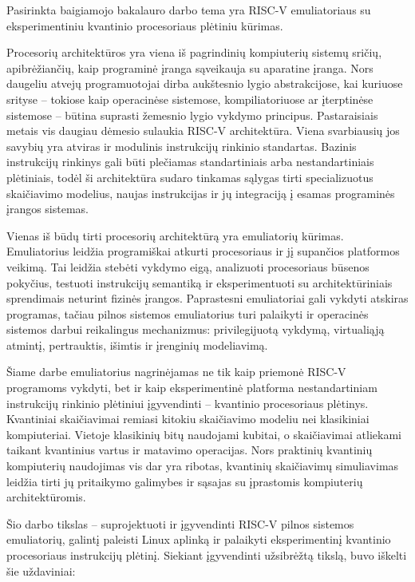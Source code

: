 
Pasirinkta baigiamojo bakalauro darbo tema yra RISC-V emuliatoriaus su eksperimentiniu kvantinio procesoriaus plėtiniu kūrimas.

Procesorių architektūros yra viena iš pagrindinių kompiuterių sistemų sričių, apibrėžiančių, kaip programinė įranga sąveikauja su aparatine įranga. Nors daugeliu atvejų programuotojai dirba aukštesnio lygio abstrakcijose, kai kuriuose srityse -- tokiose kaip operacinėse sistemose, kompiliatoriuose ar įterptinėse sistemose -- būtina suprasti žemesnio lygio vykdymo principus. Pastaraisiais metais vis daugiau dėmesio sulaukia RISC-V architektūra. Viena svarbiausių jos savybių yra atviras ir modulinis instrukcijų rinkinio standartas. Bazinis instrukcijų rinkinys gali būti plečiamas standartiniais arba nestandartiniais plėtiniais, todėl ši architektūra sudaro tinkamas sąlygas tirti specializuotus skaičiavimo modelius, naujas instrukcijas ir jų integraciją į esamas programinės įrangos sistemas.

Vienas iš būdų tirti procesorių architektūrą yra emuliatorių kūrimas. Emuliatorius leidžia programiškai atkurti procesoriaus ir jį supančios platformos veikimą. Tai leidžia stebėti vykdymo eigą, analizuoti procesoriaus būsenos pokyčius, testuoti instrukcijų semantiką ir eksperimentuoti su architektūriniais sprendimais neturint fizinės įrangos. Paprastesni emuliatoriai gali vykdyti atskiras programas, tačiau pilnos sistemos emuliatorius turi palaikyti ir operacinės sistemos darbui reikalingus mechanizmus: privilegijuotą vykdymą, virtualiąją atmintį, pertrauktis, išimtis ir įrenginių modeliavimą.

Šiame darbe emuliatorius nagrinėjamas ne tik kaip priemonė RISC-V programoms vykdyti, bet ir kaip eksperimentinė platforma nestandartiniam instrukcijų rinkinio plėtiniui įgyvendinti -- kvantinio procesoriaus plėtinys. Kvantiniai skaičiavimai remiasi kitokiu skaičiavimo modeliu nei klasikiniai kompiuteriai. Vietoje klasikinių bitų naudojami kubitai, o skaičiavimai atliekami taikant kvantinius vartus ir matavimo operacijas. Nors praktinių kvantinių kompiuterių naudojimas vis dar yra ribotas, kvantinių skaičiavimų simuliavimas leidžia tirti jų pritaikymo galimybes ir sąsajas su įprastomis kompiuterių architektūromis.

Šio darbo tikslas -- suprojektuoti ir įgyvendinti RISC-V pilnos sistemos emuliatorių, galintį paleisti Linux aplinką ir palaikyti eksperimentinį kvantinio procesoriaus instrukcijų plėtinį. Siekiant įgyvendinti užsibrėžtą tikslą, buvo iškelti šie uždaviniai:

